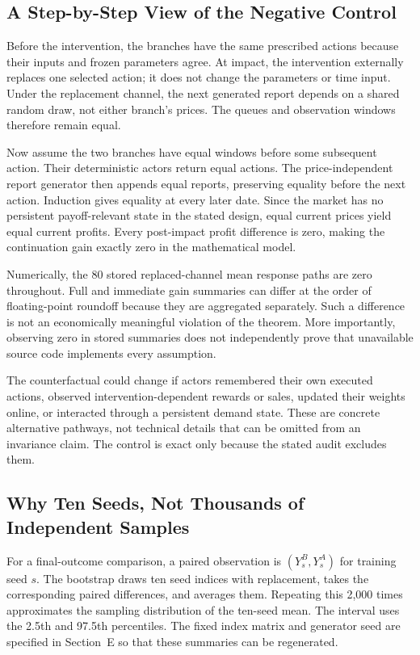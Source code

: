 \documentclass{article}
\begin{document}
\subsection{A Step-by-Step View of the Negative Control}

Before the intervention, the branches have the same prescribed actions because their inputs and frozen parameters agree. At impact, the intervention externally replaces one selected action; it does not change the parameters or time input. Under the replacement channel, the next generated report depends on a shared random draw, not either branch's prices. The queues and observation windows therefore remain equal.

Now assume the two branches have equal windows before some subsequent action. Their deterministic actors return equal actions. The price-independent report generator then appends equal reports, preserving equality before the next action. Induction gives equality at every later date. Since the market has no persistent payoff-relevant state in the stated design, equal current prices yield equal current profits. Every post-impact profit difference is zero, making the continuation gain exactly zero in the mathematical model.

Numerically, the 80 stored replaced-channel mean response paths are zero throughout. Full and immediate gain summaries can differ at the order of floating-point roundoff because they are aggregated separately. Such a difference is not an economically meaningful violation of the theorem. More importantly, observing zero in stored summaries does not independently prove that unavailable source code implements every assumption.

The counterfactual could change if actors remembered their own executed actions, observed intervention-dependent rewards or sales, updated their weights online, or interacted through a persistent demand state. These are concrete alternative pathways, not technical details that can be omitted from an invariance claim. The control is exact only because the stated audit excludes them.

\subsection{Why Ten Seeds, Not Thousands of Independent Samples}

For a final-outcome comparison, a paired observation is $(Y_s^B,Y_s^A)$ for training seed $s$. The bootstrap draws ten seed indices with replacement, takes the corresponding paired differences, and averages them. Repeating this 2,000 times approximates the sampling distribution of the ten-seed mean. The interval uses the 2.5th and 97.5th percentiles. The fixed index matrix and generator seed are specified in Section~E so that these summaries can be regenerated.
\end{document}
